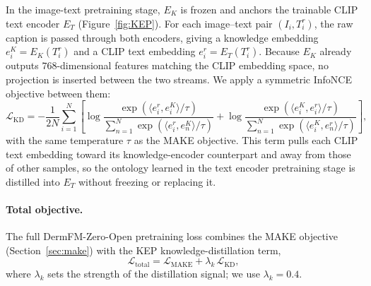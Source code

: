 \documentclass{article}
\begin{document}
In the image-text pretraining stage, $E_K$ is frozen and anchors the trainable CLIP text encoder $E_T$ (Figure~\ref{fig:KEP}). For each image--text pair $(I_i, T_i^r)$, the raw caption is passed through both encoders, giving a knowledge embedding $e_i^{K} = E_K(T_i^r)$ and a CLIP text embedding $e_i^{r} = E_T(T_i^r)$. Because $E_K$ already outputs $768$-dimensional features matching the CLIP embedding space, no projection is inserted between the two streams. We apply a symmetric InfoNCE objective between them:
\begin{equation}
\label{eq:kd_loss}
\mathcal{L}_{\mathrm{KD}} = -\frac{1}{2N}\sum_{i=1}^{N}
\left[
\log \frac{\exp(\langle e_i^r, e_i^{K} \rangle / \tau)}
         {\sum_{n=1}^N \exp(\langle e_i^r, e_n^{K} \rangle / \tau)}
+
\log \frac{\exp(\langle e_i^{K}, e_i^r \rangle / \tau)}
         {\sum_{n=1}^N \exp(\langle e_i^{K}, e_n^r \rangle / \tau)}
\right],
\end{equation}
with the same temperature $\tau$ as the MAKE objective. This term pulls each CLIP text embedding toward its knowledge-encoder counterpart and away from those of other samples, so the ontology learned in the text encoder pretraining stage is distilled into $E_T$ without freezing or replacing it.

\paragraph{Total objective.}
The full DermFM-Zero-Open pretraining loss combines the MAKE objective (Section~\ref{sec:make}) with the KEP knowledge-distillation term,
\begin{equation}
\label{eq:total_loss}
\mathcal{L}_{\mathrm{total}} = \mathcal{L}_{\mathrm{MAKE}}
                             + \lambda_k\, \mathcal{L}_{\mathrm{KD}},
\end{equation}
where $\lambda_k$ sets the strength of the distillation signal; we use $\lambda_k = 0.4$.
\end{document}
